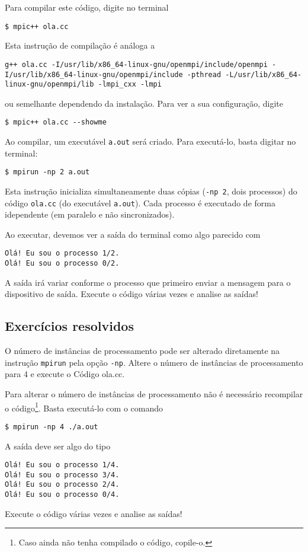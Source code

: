 Para compilar este código, digite no terminal
\begin{verbatim}
$ mpic++ ola.cc
\end{verbatim}
Esta instrução de compilação é análoga a
\begin{verbatim}
g++ ola.cc -I/usr/lib/x86_64-linux-gnu/openmpi/include/openmpi -I/usr/lib/x86_64-linux-gnu/openmpi/include -pthread -L/usr/lib/x86_64-linux-gnu/openmpi/lib -lmpi_cxx -lmpi
\end{verbatim}
ou semelhante dependendo da instalação. Para ver a sua configuração, digite
\begin{verbatim}
$ mpic++ ola.cc --showme
\end{verbatim}


Ao compilar, um executável \verb+a.out+ será criado. Para executá-lo, basta digitar no terminal:
\begin{verbatim}
$ mpirun -np 2 a.out
\end{verbatim}
Esta instrução inicializa simultaneamente duas cópias (\verb+-np 2+, dois processos) do código \verb+ola.cc+ (do executável \verb+a.out+). Cada processo é executado de forma idependente (em paralelo e não sincronizados).

Ao executar, devemos ver a saída do terminal como algo parecido com
\begin{verbatim}
Olá! Eu sou o processo 1/2.
Olá! Eu sou o processo 0/2.
\end{verbatim}

A saída irá variar conforme o processo que primeiro enviar a mensagem para o dispositivo de saída. Execute o código várias vezes e analise as saídas!

\subsection*{Exercícios resolvidos}

\begin{exeresol}
  O número de instâncias de processamento pode ser alterado diretamente na instrução \verb+mpirun+ pela opção \verb+-np+. Altere o número de instâncias de processamento para 4 e execute o Código ola.cc.
\end{exeresol}
\begin{resol}
  Para alterar o número de instâncias de processamento não é necessário recompilar o código\footnote{Caso ainda não tenha compilado o código, copile-o.}. Basta executá-lo com o comando
\begin{verbatim}
$ mpirun -np 4 ./a.out
\end{verbatim}
  A saída deve ser algo do tipo
\begin{verbatim}
Olá! Eu sou o processo 1/4.
Olá! Eu sou o processo 3/4.
Olá! Eu sou o processo 2/4.
Olá! Eu sou o processo 0/4.
\end{verbatim}
  Execute o código várias vezes e analise as saídas!
\end{resol}

